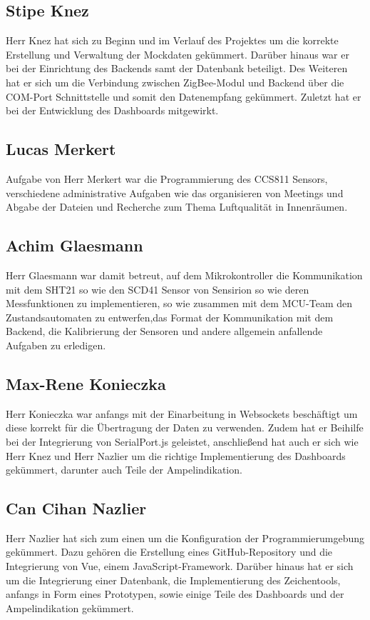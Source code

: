\documentclass[]{article}
\begin{document}
		\subsection{Stipe Knez}
			Herr Knez hat sich zu Beginn und im Verlauf des Projektes um die korrekte Erstellung und Verwaltung der Mockdaten gekümmert. Darüber hinaus war er bei der Einrichtung des Backends samt der Datenbank beteiligt. Des Weiteren hat er sich um die Verbindung zwischen ZigBee-Modul und Backend über die COM-Port Schnittstelle und somit den Datenempfang gekümmert. Zuletzt hat er bei der Entwicklung des Dashboards mitgewirkt. 
		\subsection{Lucas Merkert}
			Aufgabe von Herr Merkert war die Programmierung des CCS811 Sensors, verschiedene administrative Aufgaben wie das organisieren von Meetings und Abgabe der Dateien und Recherche zum Thema Luftqualität in Innenräumen.
		\subsection{Achim Glaesmann}
			Herr Glaesmann war damit betreut, auf dem Mikrokontroller die Kommunikation mit dem SHT21 so wie den SCD41 Sensor von Sensirion so wie deren Messfunktionen zu implementieren, so wie zusammen mit dem MCU-Team den Zustandsautomaten zu entwerfen,das Format der Kommunikation mit dem Backend, die Kalibrierung der Sensoren und andere allgemein anfallende Aufgaben zu erledigen.
		\subsection{Max-Rene Konieczka}
			Herr Konieczka war anfangs mit der Einarbeitung in Websockets beschäftigt um diese korrekt für die Übertragung der Daten zu verwenden. Zudem hat er Beihilfe bei der Integrierung von SerialPort.js geleistet, anschließend hat auch er sich wie Herr Knez und Herr Nazlier um die richtige Implementierung des Dashboards gekümmert, darunter auch Teile der Ampelindikation. 
		\subsection{Can Cihan Nazlier}
			Herr Nazlier hat sich zum einen um die Konfiguration der Programmierumgebung gekümmert. Dazu gehören die Erstellung eines GitHub-Repository und die Integrierung von Vue, einem JavaScript-Framework. Darüber hinaus hat er sich um die Integrierung einer Datenbank, die Implementierung des Zeichentools, anfangs in Form eines Prototypen, sowie einige Teile des Dashboards und der Ampelindikation gekümmert.
			\newpage
		
\end{document}
